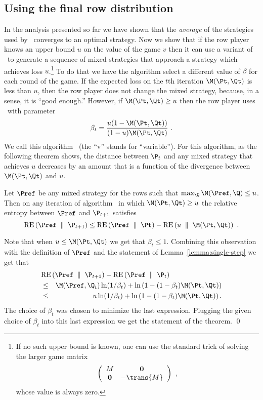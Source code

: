 \subsection{Using the final row distribution}
\label{sec:solve-var-beta}

In the analysis presented so far we have shown that the {\em average}
of the strategies used by \lwalg\ converges to an optimal
strategy. Now we show that if the row player knows an upper bound $u$ on
the value of the game $v$ then it can use a variant of \lwalg\ to
generate a sequence of mixed strategies that approach 
a strategy which achieves loss $u$.\footnote{If no such upper bound is
known, one can use the standard trick of solving the larger game
matrix 
\[
\left(
\begin{array}{cc}
M & {\bf 0} \\
{\bf 0} & -\trans{M}
\end{array}
\right)~,
\]
whose value is always zero.}
To do that we have the algorithm select a different value of $\beta$
for each round of the game. If the expected loss on the $t$th
iteration $\M(\Pt,\Qt)$ is less than $u$, then the row player does
not change the mixed strategy, because, in a sense, it is ``good
enough.''  However, if $\M(\Pt,\Qt) \geq u$ then the row player uses
\lwalg\ with parameter
\[
\beta_t = {u (1 - \M(\Pt,\Qt)) \over (1-u) \M(\Pt,\Qt)}~.
\]
We call this algorithm \lwalgvar\ (the ``v'' stands for ``variable'').
For this algorithm, as the following theorem shows, the distance between
$\P_t$ and any mixed strategy that achieves $u$ decreases by an amount
that is a function of the divergence between $\M(\Pt,\Qt)$ and $u$.

\begin{theorem} \label{thm:convergence}
Let $\Pref$ be any mixed strategy for the rows such that 
$\maxq \M(\Pref,\Q) \leq u$.
Then on any iteration of algorithm \lwalgvar\ in which 
$\M(\Pt,\Qt) \geq u$ the relative entropy between $\Pref$ and $\P_{t+1}$
satisfies
\[
\RE{\Pref}{\P_{t+1}} \leq \RE{\Pref}{\Pt} - \RE{u}{\M(\Pt,\Qt)}~.
\]
\end{theorem}

\proof
Note that when $u \leq \M(\Pt,\Qt)$ we get that $\beta_t \leq 1$.
Combining this observation with the definition of 
$\Pref$ and the statement of 
Lemma~\ref{lemma:single-step} we get that
\begin{eqnarray}
\lefteqn{\RE{\Pref}{\P_{t+1}} - \RE{\Pref}{\P_t}} \nonumber \\
&\leq&
\M(\Pref,\Q_t) \ln(1 / \beta_t)
+
\ln \left( 1-(1-\beta_t)\M(\Pt,\Qt) \right) \label{eqn:var-re-bnd} \\
&\leq&
u \ln(1 / \beta_t)
+
\ln \left( 1-(1-\beta_t)\M(\Pt,\Qt) \right). \nonumber
\end{eqnarray}
The choice of $\beta_t$ was chosen to minimize the last expression. 
Plugging the given choice of $\beta_t$ into this last expression we
get the statement of the theorem.
\qed


